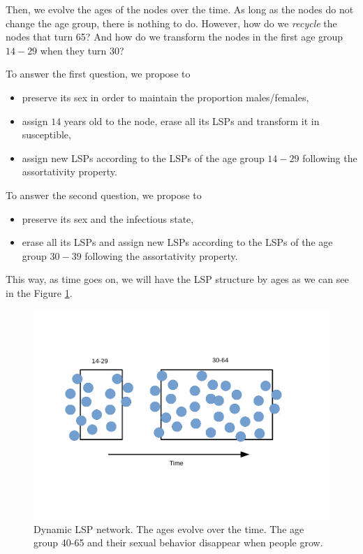 Then, we evolve the ages of the nodes over the time. As long as the nodes do not change the age group, there is nothing to do. However, how do we \textit{recycle} the nodes that turn 65? And how do we transform the nodes in the first age group $14-29$ when they turn 30?  

To answer the first question, we propose to

\begin{itemize}
	\item preserve its sex in order to maintain the proportion males/females, 
	\item assign $14$ years old to the node, erase all its LSPs and transform it in susceptible,
	\item assign new LSPs according to the LSPs of the age group $14-29$ following the assortativity property.
\end{itemize}

To answer the second question, we propose to

\begin{itemize}
	\item preserve its sex and the infectious state, 
	\item erase all its LSPs and assign new LSPs according to the LSPs of the age group $30-39$ following the assortativity property.
\end{itemize}

This way, as time goes on, we will have the LSP structure by ages as we can see in the Figure \ref{fig:dinam2}.

\begin{figure}[h!]
	\centering
	\includegraphics[width=0.7\linewidth]{IMGs/2.-New_features/Dinam_2.pdf}
	\caption{Dynamic LSP network. The ages evolve over the time. The age group 40-65 and their sexual behavior disappear when people grow.}
	\label{fig:dinam2}
\end{figure}

